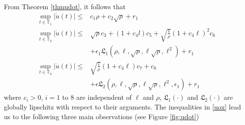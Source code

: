 \documentclass[10pt,journal]{IEEEtran}
\theoremstyle{plain}%
\theoremstyle{definition}
\newcommand{\be}[0]{\begin{equation}}
\newcommand{\ee}[0]{\end{equation}}
\newcommand{\norms}[1]{\lVert#1\rVert}
\newcommand{\normB}[0]{\norms}
\let\norm=\normB
\newcommand{\abs}[1]{\left\lvert#1\right\rvert}
\begin{document}
From Theorem \ref{thmudot}, it follows that
\be\label{uox}\begin{split}
\sup_{t\in\mathbb T_1}\abs{\dot u(t)} \leq & c_1\rho + c_2 \sqrt\rho + r_1\\ 
  \sup_{t\in\mathbb T_2}\abs{\dot{u}(t)} \leq & \sqrt \rho c_3 +  (1+c_{4} l) c_5  +  \sqrt{\frac 1 \rho}  (1+c_{4} \ell)^2   c_6 \\
   &+ \epsilon_1 \mathfrak{L}_1 (\rho,\ell,\sqrt \rho, \ell\sqrt\rho, \ell^2) + r_1\\
    \sup_{t\in\mathbb T_3}\abs{\dot{u}(t)} \leq &  \sqrt{\frac 1 \rho} (1+c_4\ell )c_7 +c_8\\ &+\epsilon \mathfrak{L}_2 (\rho,\ell,\sqrt \rho, \ell\sqrt\rho, \ell^2,\epsilon_1) + r_1
 \end{split}
\ee
where $c_i>0$, $i=1$ to $8$  are independent of $\ell$ and $\rho$, $\mathfrak L_1(\cdot)$ and $\mathfrak L_2(\cdot)$ are globally lipschitz with respect to their arguments.
The inequalities in \eqref{uox} lead us to the following three main observations (see Figure \ref{fig:udot})
\end{document}
